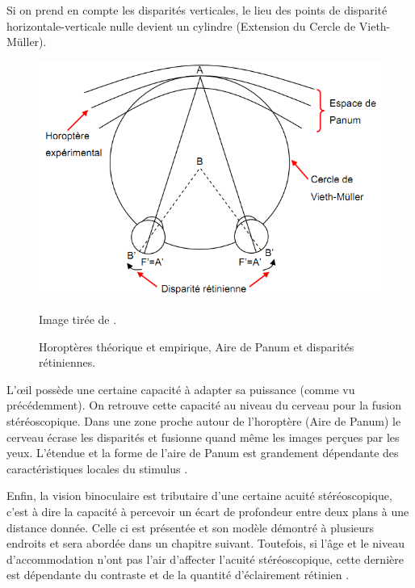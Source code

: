 	\par Si on prend en compte les disparités verticales, le lieu des points de disparité horizontale-verticale nulle devient un cylindre (Extension du Cercle de Vieth-Müller).
	
	\begin{figure}[h]
		\centering
		\includegraphics[scale=.55]{Figures/HoropterePanum}
		\caption{Horoptères théorique et empirique, Aire de Panum et disparités rétiniennes.}{Image tirée de \citep{neveu_impact_2012}.}
		\label{fig:horoptere_panum}
	\end{figure}
	
	\par L'œil possède une certaine capacité à adapter sa puissance (comme vu précédemment). On retrouve cette capacité au niveau du cerveau pour la fusion stéréoscopique. Dans une zone proche autour de l'horoptère (Aire de Panum) le cerveau écrase les disparités et fusionne quand même les images perçues par les yeux. L'étendue et la forme de l'aire de Panum est grandement dépendante des caractéristiques locales du stimulus \citep{devisme_optimisation_2004}.
	
	\par Enfin, la vision binoculaire est tributaire d'une certaine acuité stéréoscopique, c'est à dire la capacité à percevoir un écart de profondeur entre deux plans à une distance donnée. Celle ci est présentée et son modèle démontré à plusieurs endroits \citep{fuchs_traite_2003, gross_human_2008} et sera abordée dans un chapitre suivant. Toutefois, si l'âge et le niveau d'accommodation n'ont pas l'air d'affecter l'acuité stéréoscopique, cette dernière est dépendante du contraste et de la quantité d'éclairement rétinien \citep{devisme_optimisation_2004}.
	
